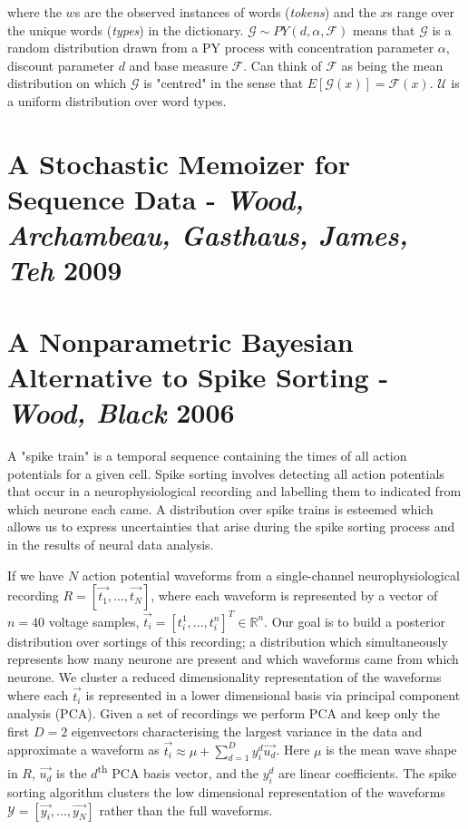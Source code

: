 where the $w$s are the observed instances of words (\textit{tokens}) and the $x$s range over the unique words (\textit{types}) in the dictionary. $\mathcal{G}\sim PY(d, \alpha, \mathcal{F})$ means that $\mathcal{G}$ is a random distribution drawn from a PY process with concentration parameter $\alpha$, discount parameter $d$ and base measure $\mathcal{F}$. Can think of $\mathcal{F}$ as being the mean distribution on which $\mathcal{G}$ is "centred" in the sense that $E[\mathcal{G}(x)]=\mathcal{F}(x)$. $\mathcal{U}$ is a uniform distribution over word types.

\section{A Stochastic Memoizer for Sequence Data - \textit{Wood, Archambeau, Gasthaus, James, Teh} 2009} \cite{wood2009stochastic}

\section{A Nonparametric Bayesian Alternative to Spike Sorting - \textit{Wood, Black} 2006} \cite{wood2008nonparametric}

A "spike train" is a temporal sequence containing the times of all action potentials for a given cell. Spike sorting involves detecting all action potentials that occur in a neurophysiological recording and labelling them to indicated from which neurone each came. A distribution over spike trains is esteemed which allows us to express uncertainties that arise during the spike sorting process and in the results of neural data analysis.

If we have $N$ action potential waveforms from a single-channel neurophysiological recording $R=[\overrightarrow{t_{1}}, ..., \overrightarrow{t_{N}}]$, where each waveform is represented by a vector of $n=40$ voltage samples, $\overrightarrow{t_{i}}=[t_{i}^{1}, ..., t_{i}^{n}]^{T}\in \mathbb{R}^{n}$. Our goal is to build a posterior distribution over sortings of this recording; a distribution which simultaneously represents how many neurone are present and which waveforms came from which neurone. We cluster a reduced dimensionality representation of the waveforms where each $\overrightarrow{t_{i}}$ is represented in a lower dimensional basis via principal component analysis (PCA). Given a set of recordings we perform PCA and keep only the first $D=2$ eigenvectors characterising the largest variance in the data and approximate a waveform as $\overrightarrow{t_{i}}\approx \mu +\sum_{d=1}^{D}y_{i}^{d}\overrightarrow{u_{d}}$. Here $\mu$ is the mean wave shape in $R$, $\overrightarrow{u_{d}}$ is the $d$\textsuperscript{th} PCA basis vector, and the $y_{i}^{d}$ are linear coefficients. The spike sorting algorithm clusters the low dimensional representation of the waveforms $\mathcal{Y}=[\overrightarrow{y_{i}}, ..., \overrightarrow{y_{N}}]$ rather than the full waveforms.

